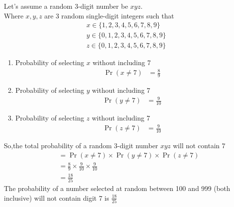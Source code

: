 
Let's assume a random 3-digit number be $xyz$.\\
Where $x,y,z$ are 3 random single-digit integers such that
\begin{align}
x\in \{1,2,3,4,5,6,7,8,9\}\\
y\in \{0,1,2,3,4,5,6,7,8,9\}\\
z\in \{0,1,2,3,4,5,6,7,8,9\}
\end{align}
\begin{enumerate}
\item
Probability of selecting $x$ without including 7
\begin{align}
    \Pr{(x\neq 7)}&=\frac{8}{9}
\end{align}
\item
Probability of selecting $y$ without including 7
\begin{align}
    \Pr{(y\neq 7)}&=\frac{9}{10}
\end{align}
\item
Probability of selecting $z$ without including 7
\begin{align}
    \Pr{(z\neq 7)}&=\frac{9}{10}
\end{align}
\end{enumerate}
So,the total probability of a random 3-digit number $xyz$ will not contain 7\\
\begin{align}
    &=\Pr{(x\neq 7)}\times\Pr{(y\neq 7)}\times\Pr{(z\neq 7)}\\
    &=\frac{8}{9}\times\frac{9}{10}\times\frac{9}{10}\\
    &=\frac{18}{25}
\end{align}
The probability of a number selected at random between 100 and 999 (both inclusive) will not contain digit 7 is $\frac{18}{25}$